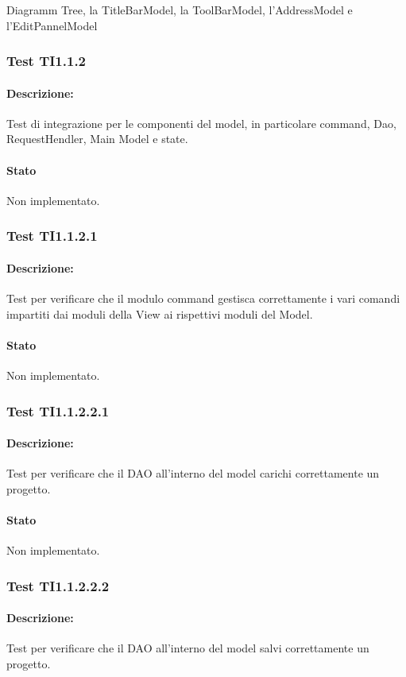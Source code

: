 \documentclass[../PianoDiQualifica.tex]{subfiles}
\begin{document}
	
	Diagramm Tree, la TitleBarModel, la ToolBarModel, l'AddressModel e l'EditPannelModel
	\subsubsection{Test TI1.1.2}
	\paragraph{Descrizione:} Test di integrazione per le componenti del model, in particolare command, Dao, RequestHendler, Main Model e state.
	\paragraph{Stato} Non implementato.
	\subsubsection{Test TI1.1.2.1}
	\paragraph{Descrizione:} Test per verificare che il modulo command gestisca correttamente i vari comandi impartiti dai moduli della View ai rispettivi moduli del Model.
	\paragraph{Stato} Non implementato.
	\subsubsection{Test TI1.1.2.2.1}
	\paragraph{Descrizione:} Test per verificare che il DAO all'interno del model carichi correttamente un progetto.
	\paragraph{Stato} Non implementato.
	
	\subsubsection{Test TI1.1.2.2.2}
	\paragraph{Descrizione:} Test per verificare che il DAO all'interno del model salvi correttamente un progetto.
\end{document}
